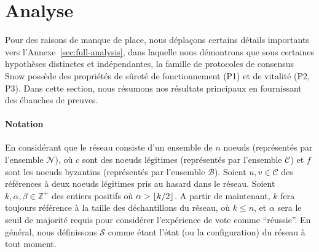 \documentclass[letterpaper,twocolumn,10pt]{article}
\DeclarePairedDelimiter{\floor}{\lfloor}{\rfloor}
\theoremstyle{definition}
\begin{document}


\section{Analyse}
\label{sec:analysis}
Pour des raisons de manque de place, nous déplaçons certains détails importants vers l'Annexe~\ref{sec:full-analysis},
dans laquelle nous démontrons que sous certaines hypothèses distinctes et indépendantes, la famille de protocoles de
consensus Snow possède des propriétés de sûreté de fonctionnement (P1) et de vitalité (P2, P3). Dans cette section,
nous résumons nos résultats principaux en fournissant des ébauches de preuves.


\paragraph{Notation} En considérant que le réseau consiste d'un ensemble de $n$ noeuds (représentés par l'ensemble
$\mathcal{N}$), où $c$ sont des noeuds légitimes (représentés par l'ensemble $\mathcal{C}$) et $f$ sont les noeuds
byzantins (représentés par l'ensemble $\mathcal{B}$). Soient $u, v \in \mathcal{C}$ des références à deux noeuds
légitimes pris au hasard dans le réseau. Soient $k, \alpha, \beta \in \mathbb{Z}^+$ des entiers positifs où
$\alpha > \floor{k/2}$. A partir de maintenant, $k$ fera toujours référence à la taille des déchantillons du réseau,
où $k \leq n$, et $\alpha$ sera le seuil de majorité requis pour considérer l'expérience de vote comme ``réussie''.
En général, nous définissons $\mathcal{S}$ comme étant l'état (ou la configuration) du réseau à tout moment.
\end{document}
